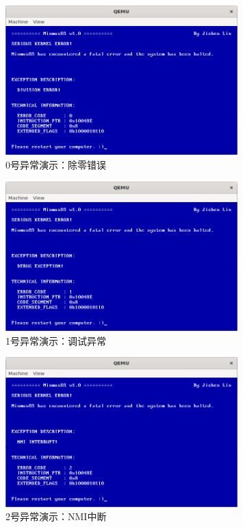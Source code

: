 \begin{figure}[htbp]
    \centering
    \includegraphics[width=0.8\textwidth]{figures/Exception0Presentation.png}
    \caption{0号异常演示：除零错误}
\end{figure}

\begin{figure}[htbp]
    \centering
    \includegraphics[width=0.8\textwidth]{figures/Exception1Presentation.png}
    \caption{1号异常演示：调试异常}
\end{figure}

\begin{figure}[htbp]
    \centering
    \includegraphics[width=0.8\textwidth]{figures/Exception2Presentation.png}
    \caption{2号异常演示：NMI中断}
\end{figure}

